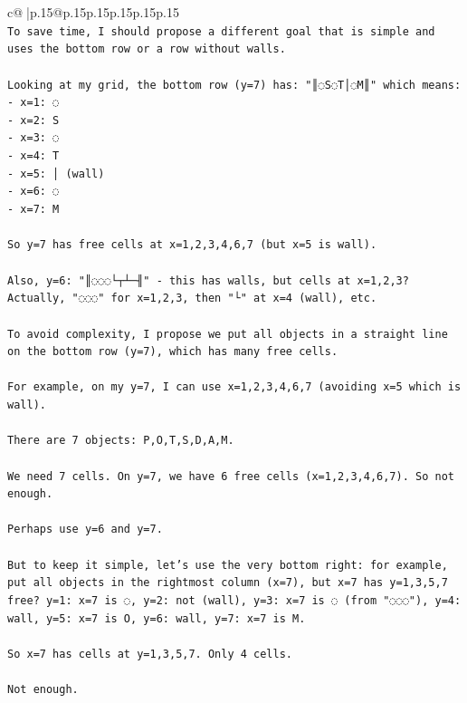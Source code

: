 \documentclass{article}
\begin{document}
{\begin{supertabular}{c@{$\;$}|p{.15\linewidth}@{}p{.15\linewidth}p{.15\linewidth}p{.15\linewidth}p{.15\linewidth}p{.15\linewidth}}
{{{\\ 
\texttt{To save time, I should propose a different goal that is simple and uses the bottom row or a row without walls.} \\
\\ 
\texttt{Looking at my grid, the bottom row (y=7) has: "║◌S◌T│◌M║" which means:} \\
\texttt{{-} x=1: ◌} \\
\texttt{{-} x=2: S} \\
\texttt{{-} x=3: ◌} \\
\texttt{{-} x=4: T} \\
\texttt{{-} x=5: │ (wall)} \\
\texttt{{-} x=6: ◌} \\
\texttt{{-} x=7: M} \\
\\ 
\texttt{So y=7 has free cells at x=1,2,3,4,6,7 (but x=5 is wall).} \\
\\ 
\texttt{Also, y=6: "║◌◌◌└┬┴─╢" {-} this has walls, but cells at x=1,2,3? Actually, "◌◌◌" for x=1,2,3, then "└" at x=4 (wall), etc.} \\
\\ 
\texttt{To avoid complexity, I propose we put all objects in a straight line on the bottom row (y=7), which has many free cells.} \\
\\ 
\texttt{For example, on my y=7, I can use x=1,2,3,4,6,7 (avoiding x=5 which is wall).} \\
\\ 
\texttt{There are 7 objects: P,O,T,S,D,A,M.} \\
\\ 
\texttt{We need 7 cells. On y=7, we have 6 free cells (x=1,2,3,4,6,7). So not enough.} \\
\\ 
\texttt{Perhaps use y=6 and y=7.} \\
\\ 
\texttt{But to keep it simple, let's use the very bottom right: for example, put all objects in the rightmost column (x=7), but x=7 has y=1,3,5,7 free? y=1: x=7 is ◌, y=2: not (wall), y=3: x=7 is ◌ (from "◌◌◌"), y=4: wall, y=5: x=7 is O, y=6: wall, y=7: x=7 is M.} \\
\\ 
\texttt{So x=7 has cells at y=1,3,5,7. Only 4 cells.} \\
\\ 
\texttt{Not enough.} \\
}}}
\end{supertabular}}
\end{document}
